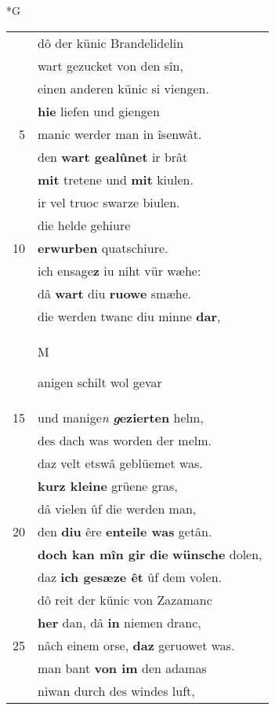\documentclass[8pt,a4paper,notitlepage]{article}
\begin{document}
\begin{table}[ht]
\begin{minipage}[t]{0.5\linewidth}
\small
\begin{center}*G
\end{center}
\begin{tabular}{rl}
 & dô der künic Brandelidelin\\ 
 & wart gezucket von den sîn,\\ 
 & einen anderen künic si viengen.\\ 
 & \textbf{hie} liefen und giengen\\ 
5 & manic werder man in îsenwât.\\ 
 & den \textbf{wart gealûnet} ir brât\\ 
 & \textbf{mit} tretene und \textbf{mit} kiulen.\\ 
 & ir vel truoc swarze biulen.\\ 
 & die helde gehiure\\ 
10 & \textbf{erwurben} quatschiure.\\ 
 & ich ensage\textbf{z} iu niht vür wæhe:\\ 
 & dâ \textbf{wart} diu \textbf{ruowe} smæhe.\\ 
 & die werden twanc diu minne \textbf{dar},\\ 
 & \begin{large}M\end{large}anigen schilt wol gevar\\ 
15 & und manige\textit{n} \textbf{\textit{g}ezierten} helm,\\ 
 & des dach was worden der melm.\\ 
 & daz velt etswâ geblüemet was.\\ 
 & \textbf{kurz kleine} grüene gras,\\ 
 & dâ vielen ûf die werden man,\\ 
20 & den \textbf{diu} êre \textbf{enteile was} getân.\\ 
 & \textbf{doch kan mîn gir} \textbf{die} \textbf{wünsche} dolen,\\ 
 & daz \textbf{ich gesæze êt} ûf dem volen.\\ 
 & dô reit der künic von Zazamanc\\ 
 & \textbf{her} dan, dâ \textbf{in} niemen dranc,\\ 
25 & nâch einem orse, \textbf{daz} geruowet was.\\ 
 & man bant \textbf{von im} den adamas\\ 
 & niwan durch des windes luft,\\ 

\end{tabular}
\end{minipage}
\end{table}
\end{document}

